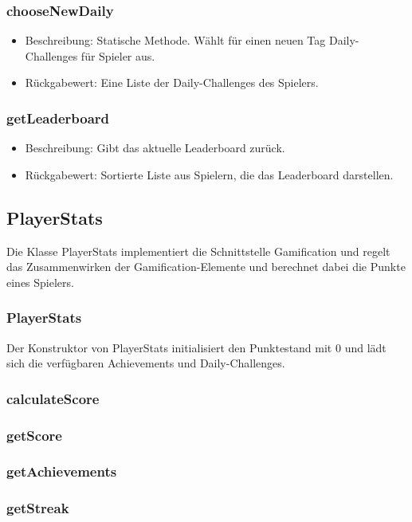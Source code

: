\documentclass[a4paper]{scrreprt}
\begin{document}
   \subsubsection{chooseNewDaily}
   \begin{itemize}
   \item Beschreibung: Statische Methode. Wählt für einen neuen Tag Daily-Challenges für Spieler aus.
   \item Rückgabewert: Eine Liste der Daily-Challenges des Spielers.
  \end{itemize}
   \subsubsection{getLeaderboard}
   \begin{itemize}
     \item Beschreibung: Gibt das aktuelle Leaderboard zurück.
     \item Rückgabewert: Sortierte Liste aus Spielern, die das Leaderboard darstellen.
   \end{itemize}
   
   
   \subsection{PlayerStats}
   Die Klasse PlayerStats implementiert die Schnittstelle Gamification und regelt das Zusammenwirken der Gamification-Elemente und berechnet dabei die Punkte eines Spielers.
   \subsubsection{PlayerStats}
   Der Konstruktor von PlayerStats initialisiert den Punktestand mit 0 und lädt sich die verfügbaren Achievements und Daily-Challenges.
   \subsubsection{calculateScore}
   \subsubsection{getScore}
   \subsubsection{getAchievements}
   \subsubsection{getStreak}
\end{document}
